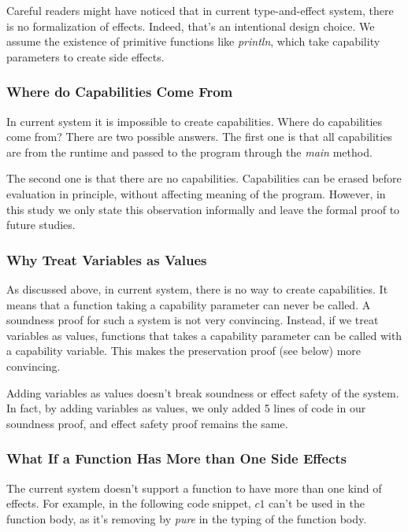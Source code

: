 Careful readers might have noticed that in current type-and-effect
system, there is no formalization of effects. Indeed, that's an
intentional design choice. We assume the existence of primitive
functions like \emph{println}, which take capability parameters to
create side effects.


\subsubsection{Where do Capabilities Come From}

In current system it is impossible to create capabilities. Where do
capabilities come from?  There are two possible answers. The first one
is that all capabilities are from the runtime and passed to the
program through the \emph{main} method.

The second one is that there are no capabilities. Capabilities can be
erased before evaluation in principle, without affecting meaning of
the program. However, in this study we only state this observation
informally and leave the formal proof to future studies.

\subsubsection{Why Treat Variables as Values}

As discussed above, in current system, there is no way to create
capabilities. It means that a function taking a capability parameter
can never be called. A soundness proof for such a system is not very
convincing. Instead, if we treat variables as values, functions that
takes a capability parameter can be called with a capability
variable. This makes the preservation proof (see below) more
convincing.

Adding variables as values doesn't break soundness or effect safety of
the system. In fact, by adding variables as values, we only added 5
lines of code in our soundness proof, and effect safety proof remains
the same.

\subsubsection{What If a Function Has More than One Side Effects}

The current system doesn't support a function to have more than one
kind of effects. For example, in the following code snippet, $c1$
can't be used in the function body, as it's removing by \emph{pure} in
the typing of the function body.

